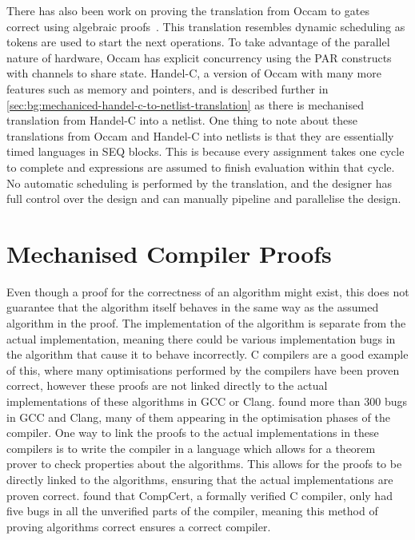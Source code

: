 There has also been work on proving the translation from Occam to
gates~\cite{page91_compil_occam} correct using algebraic
proofs~\cite{jifeng93_towar}.  This translation resembles dynamic scheduling as
tokens are used to start the next operations.  To take advantage of the parallel
nature of hardware, Occam has explicit concurrency using the PAR constructs with
channels to share state.  Handel-C, a version of Occam with many more features
such as memory and pointers, and is described further in
\cref{sec:bg:mechaniced-handel-c-to-netlist-translation} as there is mechanised
translation from Handel-C into a netlist.  One thing to note about these
translations from Occam and Handel-C into netlists is that they are essentially
timed languages in SEQ blocks.  This is because every assignment takes one cycle
to complete and expressions are assumed to finish evaluation within that cycle.
No automatic scheduling is performed by the translation, and the designer has
full control over the design and can manually pipeline and parallelise the
design.

\section{Mechanised Compiler Proofs}%
\label{sec:bg:mechanised-compiler-proofs}

Even though a proof for the correctness of an algorithm might exist, this does
not guarantee that the algorithm itself behaves in the same way as the assumed
algorithm in the proof.  The implementation of the algorithm is separate from
the actual implementation, meaning there could be various implementation bugs in
the algorithm that cause it to behave incorrectly.  C compilers are a good
example of this, where many optimisations performed by the compilers have been
proven correct, however these proofs are not linked directly to the actual
implementations of these algorithms in GCC or Clang.
\textcite{yang11_findin_under_bugs_c_compil} found more than 300 bugs in GCC and
Clang, many of them appearing in the optimisation phases of the compiler.  One
way to link the proofs to the actual implementations in these compilers is to
write the compiler in a language which allows for a theorem prover to check
properties about the algorithms.  This allows for the proofs to be directly
linked to the algorithms, ensuring that the actual implementations are proven
correct.  \citeauthor{yang11_findin_under_bugs_c_compil} found that CompCert, a
formally verified C compiler, only had five bugs in all the unverified parts of
the compiler, meaning this method of proving algorithms correct ensures a
correct compiler.

